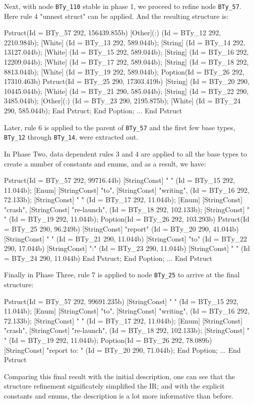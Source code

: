 Next, with node {\tt BTy\_110} stable in phase 1, we proceed to
refine node {\tt BTy\_57}. Here rule 4 "unnest struct" can be applied.
And the resulting structure is:

\begin{code}
Pstruct(Id = BTy_57 292, 156439.855b)
  [Other](:) (Id = BTy_12 292, 2210.984b);
  [White] (Id = BTy_13 292, 589.044b);
  [String] (Id = BTy_14 292, 13127.044b);
  [White] (Id = BTy_15 292, 589.044b);
  [String] (Id = BTy_16 292, 12209.044b);
  [White] (Id = BTy_17 292, 589.044b);
  [String] (Id = BTy_18 292, 8813.044b);
  [White] (Id = BTy_19 292, 589.044b);
  Poption(Id = BTy_26 292, 17310.463b)
    Pstruct(Id = BTy_25 290, 17303.419b)
      [String] (Id = BTy_20 290, 10445.044b);
      [White] (Id = BTy_21 290, 585.044b);
      [String] (Id = BTy_22 290, 3485.044b);
      [Other](:) (Id = BTy_23 290, 2195.875b);
      [White] (Id = BTy_24 290, 585.044b);
    End Pstruct;
  End Poption;
  ...
End Pstruct
\end{code}

Later, rule 6 is applied to the parent of {\tt BTy\_57} and the first few
base types, {\tt BTy\_12} through {\tt BTy\_14}, were extracted out. 

In Phase Two, data dependent rules 3 and 4 are applied to all the base types to 
create a number of constants and enums, and as a result, 
we have:

\begin{code}
Pstruct(Id = BTy_57 292, 99716.44b)
  [StringConst] " " (Id = BTy_15 292, 11.044b);
  [Enum] {[StringConst] "to", [StringConst] "writing", } 
		(Id = BTy_16 292, 72.133b);
  [StringConst] " " (Id = BTy_17 292, 11.044b);
  [Enum] {[StringConst] "crash", [StringConst] "re-launch", } 
		(Id = BTy_18 292, 102.133b);
  [StringConst] " " (Id = BTy_19 292, 11.044b);
  Poption(Id = BTy_26 292, 103.293b)
    Pstruct(Id = BTy_25 290, 96.249b)
      [StringConst] "report" (Id = BTy_20 290, 41.044b)
      [StringConst] " " (Id = BTy_21 290, 11.044b)
      [StringConst] "to" (Id = BTy_22 290, 17.044b)
      [StringConst] ":" (Id = BTy_23 290, 11.044b)
      [StringConst] " " (Id = BTy_24 290, 11.044b)
    End Pstruct;
  End Poption;
...
End Pstruct
\end{code}

Finally in Phase Three, rule 7 is applied to node {\tt BTy\_25} to arrive at the 
final structure:
\begin{code}
Pstruct(Id = BTy_57 292, 99691.235b)
  [StringConst] " " (Id = BTy_15 292, 11.044b);
  [Enum] {[StringConst] "to", [StringConst] "writing", } 
		(Id = BTy_16 292, 72.133b);
  [StringConst] " " (Id = BTy_17 292, 11.044b);
  [Enum] {[StringConst] "crash", [StringConst] "re-launch", } 
		(Id = BTy_18 292, 102.133b);
  [StringConst] " " (Id = BTy_19 292, 11.044b);
  Poption(Id = BTy_26 292, 78.089b)
  	[StringConst] "report to: " (Id = BTy_20 290, 71.044b);
  End Poption;
  ...
End Pstruct
\end{code}

Comparing this final result with the initial description, one can see that
the structure refinement significately simplified the IR; and with
the explicit constants and enums, the description is a lot more
informative than before.
